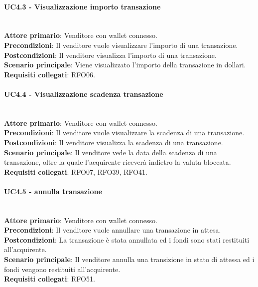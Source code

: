 \documentclass[a4paper, 12pt]{article}
\begin{document}
\paragraph{UC4.3 - Visualizzazione importo transazione}\\
\textbf{Attore primario}: Venditore con wallet connesso.\\
\textbf{Precondizioni}: Il venditore vuole visualizzare l'importo di una transazione.\\
\textbf{Postcondizioni}: Il venditore visualizza l'importo di una transazione.\\
\textbf{Scenario principale}: Viene visualizzato l'importo della transazione in dollari.\\
\textbf{Requisiti collegati}: RFO06.

\paragraph{UC4.4 - Visualizzazione scadenza transazione}\\
\textbf{Attore primario}: Venditore  con wallet connesso.\\
\textbf{Precondizioni}: Il venditore vuole visualizzare la scadenza di una transazione.\\
\textbf{Postcondizioni}: Il venditore visualizza la scadenza di una transazione.\\
\textbf{Scenario principale}: Il venditore vede la data della scadenza di una transazione, oltre la quale l'acquirente riceverà indietro la valuta bloccata.\\
\textbf{Requisiti collegati}: RFO07, RFO39, RFO41.

\paragraph{UC4.5 - annulla transazione}\\
\textbf{Attore primario}: Venditore  con wallet connesso.\\
\textbf{Precondizioni}: Il venditore vuole annullare una transazione in attesa.\\
\textbf{Postcondizioni}: La transazione è stata annullata ed i fondi sono stati restituiti all'acquirente.\\
\textbf{Scenario principale}: Il venditore annulla una transizione in stato di attessa ed i fondi vengono restituiti all'acquirente.\\
\textbf{Requisiti collegati}: RFO51.
\end{document}
